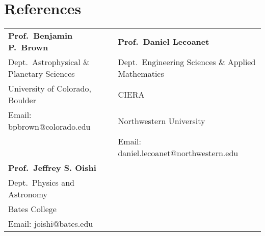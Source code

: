 \section{References}

\begin{tabular}{ll}
\textbf{Prof.~Benjamin P.~Brown} 					&\hspace{0.5in} \textbf{Prof.~Daniel Lecoanet}  					\\
Dept.~Astrophysical \& Planetary Sciences			&\hspace{0.5in} Dept.~Engineering Sciences \& Applied Mathematics 	\\
University of Colorado, Boulder  					&\hspace{0.5in} CIERA 												\\
Email: bpbrown@colorado.edu							&\hspace{0.5in} Northwestern University     						\\
													&\hspace{0.5in} Email: daniel.lecoanet@northwestern.edu             \\
\textbf{Prof.~Jeffrey S. Oishi}			\\
Dept.~Physics and Astronomy				\\
Bates College				 			\\
Email: joishi@bates.edu 				\\
     \end{tabular}

